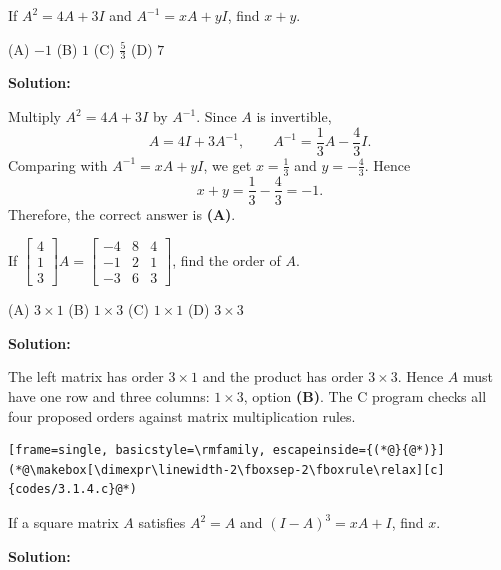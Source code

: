 \documentclass[journal]{IEEEtran}
\begin{document}
\begin{list}{}{\setlength{\leftmargin}{1.15cm}\setlength{\labelwidth}{1.0cm}\setlength{\labelsep}{0.15cm}\setlength{\itemindent}{0pt}\setlength{\listparindent}{0pt}\setlength{\itemsep}{\baselineskip}\setlength{\parsep}{0pt}\setlength{\topsep}{0pt}}
\item[3.1.2] If $A^2=4A+3I$ and $A^{-1}=xA+yI$, find $x+y$.

\noindent (A) $-1$ \hfill (B) $1$ \hfill (C) $\frac53$ \hfill (D) $7$

\vspace{0.6em}\par\noindent\textbf{Solution:}

Multiply $A^2=4A+3I$ by $A^{-1}$. Since $A$ is invertible,
\[
A=4I+3A^{-1},\qquad A^{-1}=\frac13A-\frac43I.
\]
Comparing with $A^{-1}=xA+yI$, we get $x=\frac13$ and $y=-\frac43$. Hence
\[
x+y=\frac13-\frac43=-1.
\]
Therefore, the correct answer is \textbf{(A)}.
\item[3.1.4] If $\begin{bmatrix}4\\1\\3\end{bmatrix}A=\begin{bmatrix}-4&8&4\\-1&2&1\\-3&6&3\end{bmatrix}$, find the order of $A$.

\noindent (A) $3\times1$ \hfill (B) $1\times3$ \hfill (C) $1\times1$ \hfill (D) $3\times3$

\vspace{0.6em}\par\noindent\textbf{Solution:}

The left matrix has order $3\times1$ and the product has order $3\times3$. Hence $A$ must have one row and three columns: $\boxed{1\times3}$, option \textbf{(B)}. The C program checks all four proposed orders against matrix multiplication rules.
\begin{lstlisting}[frame=single, basicstyle=\rmfamily, escapeinside={(*@}{@*)}]
(*@\makebox[\dimexpr\linewidth-2\fboxsep-2\fboxrule\relax][c]{codes/3.1.4.c}@*)
\end{lstlisting}

\item[3.1.5] If a square matrix $A$ satisfies $A^2=A$ and $(I-A)^3=xA+I$, find $x$.

\vspace{0.6em}\par\noindent\textbf{Solution:}


\end{list}
\end{document}
